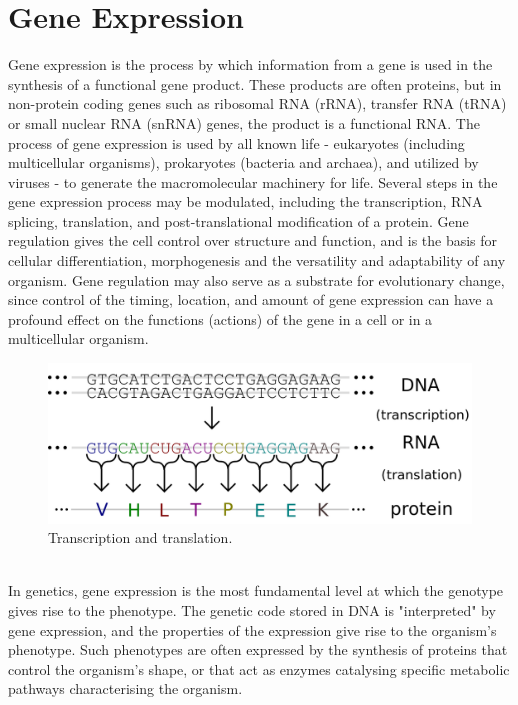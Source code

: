 \documentclass[a4paper]{report}
\begin{document}
\chapter{Gene Expression}

Gene expression is the process by which information from a gene is used in the synthesis of a functional gene product. These products are often proteins, but in non-protein coding genes such as ribosomal RNA (rRNA), transfer RNA (tRNA) or small nuclear RNA (snRNA) genes, the product is a functional RNA. The process of gene expression is used by all known life - eukaryotes (including multicellular organisms), prokaryotes (bacteria and archaea), and utilized by viruses - to generate the macromolecular machinery for life. Several steps in the gene expression process may be modulated, including the transcription, RNA splicing, translation, and post-translational modification of a protein. Gene regulation gives the cell control over structure and function, and is the basis for cellular differentiation, morphogenesis and the versatility and adaptability of any organism. Gene regulation may also serve as a substrate for evolutionary change, since control of the timing, location, and amount of gene expression can have a profound effect on the functions (actions) of the gene in a cell or in a multicellular organism.
\\
\begin{figure}[htb] 
\begin{center}
\includegraphics[scale=0.27]{figure/geneticCode.png} 
\end{center}
\caption{Transcription and translation.}
\label{geneExpression}
\end{figure}
\\
In genetics, gene expression is the most fundamental level at which the genotype gives rise to the phenotype. The genetic code stored in DNA is "interpreted" by gene expression, and the properties of the expression give rise to the organism's phenotype. Such phenotypes are often expressed by the synthesis of proteins that control the organism's shape, or that act as enzymes catalysing specific metabolic pathways characterising the organism.
\end{document}
